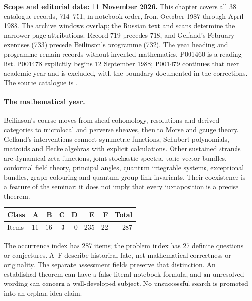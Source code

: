 \setlength{\emergencystretch}{3em}
\noindent\textbf{Scope and editorial date: 11 November 2026.}
This chapter covers all 38 catalogue records, 714--751, in notebook
order, from October 1987 through April 1988. The archive windows overlap;
the Russian text and scans determine the narrower page attributions.
Record 719 precedes 718, and Gelfand's February exercises (733) precede
Beilinson's programme (732). The year heading and programme remain
records without invented mathematics. P001460 is a reading list.
P001478 explicitly begins 12 September 1988; P001479 continues that
next academic year and is excluded, with the boundary documented in
the corrections. The source catalogue is \citet{mccme2026gelfand}.

\paragraph{The mathematical year.}
Beilinson's course moves from sheaf cohomology, resolutions and derived
categories to microlocal and perverse sheaves, then to Morse and gauge
theory. Gelfand's interventions connect symmetric functions, Schubert
polynomials, matroids and Hecke algebras with explicit calculations.
Other sustained strands are dynamical zeta functions, joint stochastic
spectra, toric vector bundles, conformal field theory, principal angles,
quantum integrable systems, exceptional bundles, graph colouring and
quantum-group link invariants. Their coexistence is a feature of the
seminar; it does not imply that every juxtaposition is a precise theorem.

\begin{center}
\begin{tabular}{@{}lrrrrrrr@{}}
\toprule
Class & A & B & C & D & E & F & Total\\
\midrule
Items & 11 & 16 & 3 & 0 & 235 & 22 & 287\\
\bottomrule
\end{tabular}
\end{center}
The occurrence index has 287 items; the problem index has 27
definite questions or conjectures. A--F describe historical fate,
not mathematical correctness or originality. The separate assessment
fields preserve that distinction. An established theorem can have a
false literal notebook formula, and an unresolved wording can concern
a well-developed subject. No unsuccessful search is promoted into an
orphan-idea claim.

